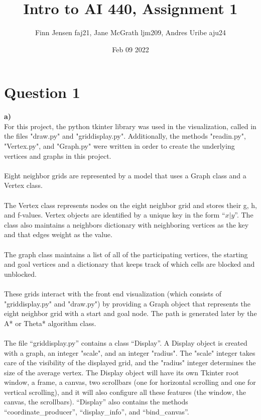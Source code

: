 \documentclass[12pt]{article}
\title{Intro to AI 440, Assignment 1}
\author{Finn Jensen faj21, Jane McGrath ljm209, Andres Uribe aju24}
\date{Feb 09 2022}
\begin{document}
\maketitle
\thispagestyle{fancy}

\maketitle

\section*{Question 1} 
{
{\bf a)}
\\
For this project, the python tkinter library was used in the visualization, called in the files "draw.py" and "griddisplay.py". Additionally, the methods "readin.py", "Vertex.py", and "Graph.py" were written in order to create the underlying vertices and graphs in this project.
\\
\\
Eight neighbor grids are represented by a model that uses a Graph class and a Vertex class.
\\
\\
The Vertex class represents nodes on the eight neighbor grid and stores their g, h, and f-values. Vertex objects are identified by a unique key in the form “$x|y$”. The class also maintains a neighbors dictionary with neighboring vertices as the key and that edges weight as the value.
\\
\\
The graph class maintains a list of all of the participating vertices, the starting and goal vertices and a dictionary that keeps track of which cells are blocked and unblocked.
\\
\\
These grids interact with the front end visualization (which consists of "griddisplay.py" and "draw.py") by providing a Graph object that represents the eight neighbor grid with a start and goal node. The path is generated later by the A* or Theta* algorithm class.
\\
\\
The file “griddisplay.py” contains a class “Display”. A Display object is created with a graph, an integer "scale", and an integer "radius". The "scale" integer takes care of the visibility of the displayed grid, and the "radius" integer determines the size of the average vertex. The Display object will have its own Tkinter root window, a frame, a canvas, two scrollbars (one for horizontal scrolling and one for vertical scrolling), and it will also configure all these features (the window, the canvas, the scrollbars). “Display” also contains the methods “coordinate\_producer”, “display\_info”, and “bind\_canvas”.
}
\end{document}
